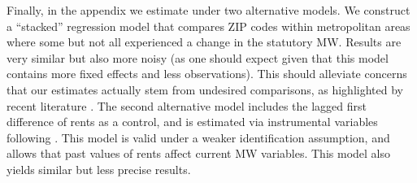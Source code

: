 Finally, in the appendix we estimate under two alternative models.
We construct a ``stacked'' regression model that compares ZIP codes within 
metropolitan areas where some but not all experienced a change in the 
statutory MW.
Results are very similar but also more noisy (as one should expect given
that this model contains more fixed effects and less observations).
This should alleviate concerns that our estimates actually stem from undesired 
comparisons, as highlighted by recent literature 
\parencite{deChaisemartinEtAl2022,RothEtAl2022}.
The second alternative model includes the lagged first difference of rents as 
a control, and is estimated via instrumental variables following 
\textcite{ArellanoBond1991, MeerWest2016}.
This model is valid under a weaker identification assumption, and allows that
past values of rents affect current MW variables.
This model also yields similar but less precise results.


